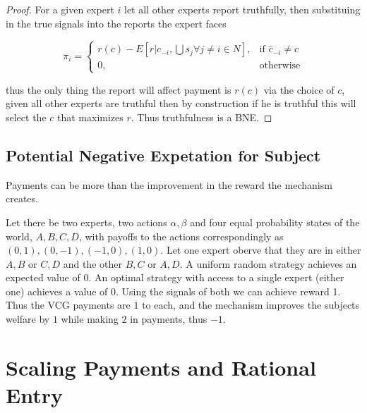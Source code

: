 \begin{proof}
For a given expert $i$ let all other experts report truthfully, then substituing in the true signals into the reports the expert faces 


\[
    \pi_i = 
\begin{cases}
    r(c) -  E[ r| c_{-i}, \bigcup s_j  \forall j \neq i \in N] ,& \text{if } \hat{c}_{-i} \neq c\\
    0,              & \text{otherwise}
\end{cases}
\]

thus the only thing the report will affect  payment is $r(c)$ via the choice of $c$, given all other experts are truthful then by construction if he is truthful this will select the $c$ that maximizes $r$. Thus truthfulness is a BNE.

\end{proof}

\subsection{Potential Negative Expetation for Subject}

Payments can be more than the improvement in the reward the mechanism creates.

\begin{eg}
	Let there be two experts, two actions ${\alpha,\beta}$ and four equal probability states of the world, ${A,B,C,D}$, with payoffs to the actions correspondingly as ${(0,1),(0,-1),(-1,0),(1,0)}$. Let one expert oberve that they are in either ${A,B}$ or ${C,D}$ and the other ${B,C}$ or ${A,D}$. A uniform random strategy achieves an expected value of 0. An optimal strategy with access to a single expert (either one) achieves a value of 0. Using the signals of both we can achieve reward 1. Thus the VCG payments are $1$ to each, and the mechanism improves the subjects welfare by $1$ while making $2$ in payments, thus $-1$. 
\end{eg}




\section{Scaling Payments and Rational Entry}

